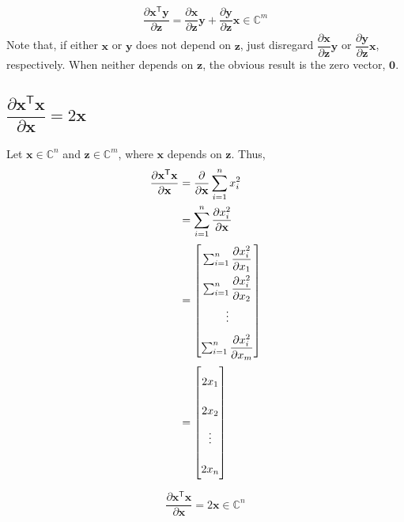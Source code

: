 \documentclass{article}
\newcommand{\trans}{\mathsf{T}}
\begin{document}
\begin{align}
    \boxed{\dfrac{\partial \mathbf{x}^\trans \mathbf{y}}{\partial \mathbf{z}} = \dfrac{\partial \mathbf{x}}{\partial \mathbf{z}}\mathbf{y} + \dfrac{\partial \mathbf{y}}{\partial \mathbf{z}}\mathbf{x} \in \mathbb{C}^{m}}
\end{align}
Note that, if either \(\mathbf{x}\) or \(\mathbf{y}\) does not depend on \(\mathbf{z}\), just disregard \(\dfrac{\partial \mathbf{x}}{\partial \mathbf{z}}\mathbf{y}\) or \(\dfrac{\partial \mathbf{y}}{\partial \mathbf{z}}\mathbf{x}\), respectively. When neither depends on \(\mathbf{z}\), the obvious result is the zero vector, \(\mathbf{0}\).

\subsection{\(\dfrac{\partial \mathbf{x}^\trans \mathbf{x}}{\partial \mathbf{x}} = 2\mathbf{x}\)}
Let \(\mathbf{x} \in \mathbb{C}^{n}\) and \(\mathbf{z}\in \mathbb{C}^m\), where \(\mathbf{x}\) depends on \(\mathbf{z}\). Thus,
\begin{align}
    \dfrac{\partial \mathbf{x}^\trans \mathbf{x}}{\partial \mathbf{x}} & = \dfrac{\partial}{\partial \mathbf{x}}\sum_{i=1}^{n} x_i^2 \\
    & = \sum_{i=1}^{n} \dfrac{\partial x_i^2}{\partial \mathbf{x}} \\
    & = \renewcommand{\arraystretch}{2.2}\begin{bmatrix}
        \sum_{i=1}^{n} \dfrac{\partial x_i^2}{\partial x_1} \\
        \sum_{i=1}^{n} \dfrac{\partial x_i^2}{\partial x_2} \\
        \vdots \\
        \sum_{i=1}^{n} \dfrac{\partial x_i^2}{\partial x_m} \\
    \end{bmatrix} \\
    & = \renewcommand{\arraystretch}{2.2}\begin{bmatrix}
        2x_1 \\
        2x_2 \\
        \vdots \\
        2x_n \\
    \end{bmatrix}
\end{align}
\begin{align}
    \boxed{\dfrac{\partial \mathbf{x}^\trans \mathbf{x}}{\partial \mathbf{x}} = 2\mathbf{x} \in \mathbb{C}^n}
\end{align}
\end{document}

